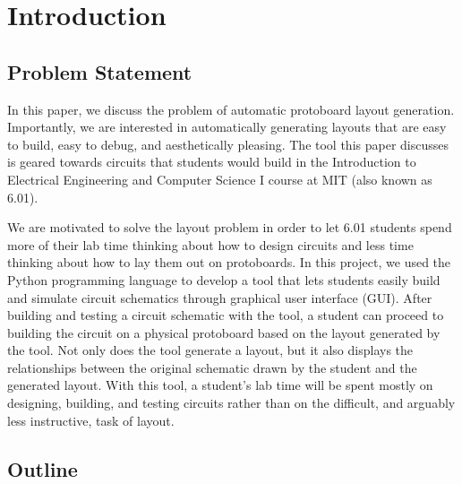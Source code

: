 

\chapter{Introduction}
\label{ch:intro}

\section{Problem Statement}

In this paper, we discuss the problem of automatic protoboard layout generation.
Importantly, we are interested in automatically generating layouts that are
easy to build, easy to debug, and aesthetically pleasing. The tool this
paper discusses
is geared towards circuits that students would build in the
Introduction to Electrical Engineering and Computer Science I\cite{sixohone} 
course at MIT (also known as 6.01).

We are motivated to solve the layout
problem in order to let 6.01 students spend more of their lab time thinking
about how to design
circuits and less time thinking about how to lay them out on protoboards.
In this project, we used the Python programming language to develop a tool
that lets students easily build and
simulate circuit schematics through graphical user interface (GUI).
After building and testing a circuit schematic with the tool, a student can
proceed to building the circuit on a physical protoboard based on the layout
generated by the tool. Not only does the tool generate a layout, but it
also displays the relationships between the original schematic drawn by the
student and the generated layout.
With this tool, a student's lab time will be spent mostly
on designing, building, and testing circuits rather than on the difficult, and
arguably less instructive, task of layout.

\section{Outline}

